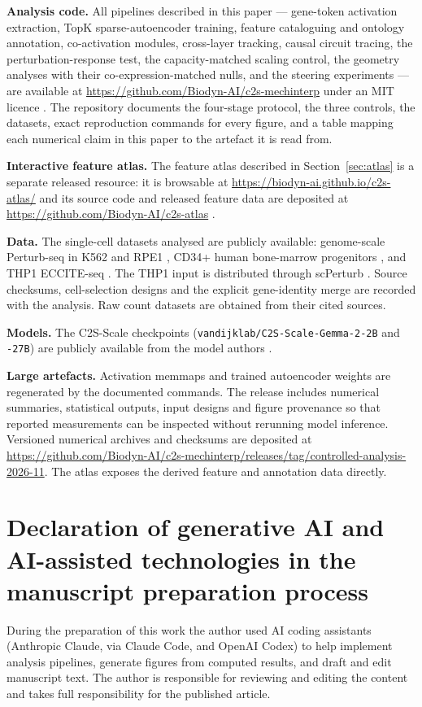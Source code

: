 \documentclass[review,authoryear,12pt]{elsarticle}
\begin{document}
\textbf{Analysis code.} All pipelines described in this paper --- gene-token activation extraction,
TopK sparse-autoencoder training, feature cataloguing and ontology annotation, co-activation modules,
cross-layer tracking, causal circuit tracing, the perturbation-response test, the capacity-matched
scaling control, the geometry analyses with their co-expression-matched nulls, and the steering
experiments --- are available at \url{https://github.com/Biodyn-AI/c2s-mechinterp} under an MIT licence
\citep{refcode}. The repository documents the four-stage protocol, the three controls, the datasets, exact
reproduction commands for every figure, and a table mapping each numerical claim in this paper to the
artefact it is read from.

\textbf{Interactive feature atlas.} The feature atlas described in Section~\ref{sec:atlas} is a
separate released resource: it is browsable at \url{https://biodyn-ai.github.io/c2s-atlas/} and its
source code and released feature data are deposited at
\url{https://github.com/Biodyn-AI/c2s-atlas} \citep{refatlas}.

\textbf{Data.} The single-cell datasets analysed are publicly available: genome-scale Perturb-seq in
K562 and RPE1 \citep{ref24}, CD34+ human bone-marrow progenitors \citep{ref25}, and THP1
ECCITE-seq \citep{refPapalexi}. The THP1 input is distributed through scPerturb
\citep{refScPerturb}. Source checksums, cell-selection designs and the explicit gene-identity merge
are recorded with the analysis. Raw count datasets are obtained from their cited sources.

\textbf{Models.} The C2S-Scale checkpoints (\texttt{vandijklab/C2S-Scale-Gemma-2-2B} and
\texttt{-27B}) are publicly available from the model authors \citep{ref2}.

\textbf{Large artefacts.} Activation memmaps and trained autoencoder weights are regenerated by
the documented commands. The release includes numerical summaries, statistical outputs, input
designs and figure provenance so that reported measurements can be inspected without rerunning
model inference. Versioned numerical archives and checksums are deposited at
\url{https://github.com/Biodyn-AI/c2s-mechinterp/releases/tag/controlled-analysis-2026-11}.
The atlas exposes the derived feature and annotation data directly.

\section*{Declaration of generative AI and AI-assisted technologies in the manuscript preparation
process}
During the preparation of this work the author used AI coding assistants (Anthropic Claude, via
Claude Code, and OpenAI Codex) to help implement analysis pipelines, generate figures from computed
results, and draft and edit manuscript text. The author is responsible for reviewing and editing
the content and takes full responsibility for the published article.
\end{document}

